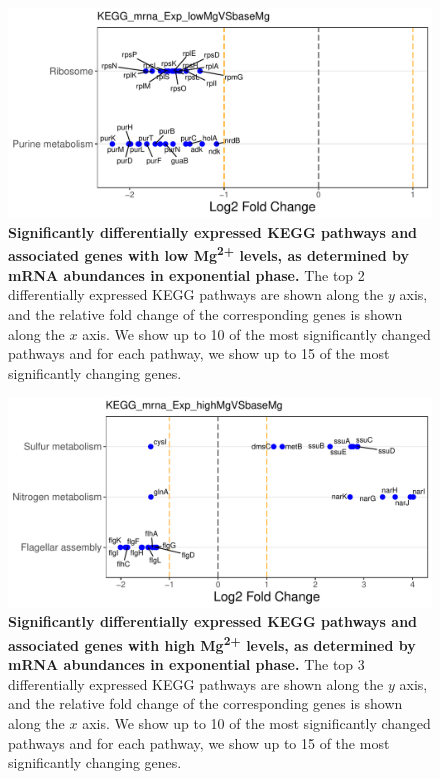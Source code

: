 \documentclass[a4paper]{article}
\begin{document}
\clearpage
\begin{figure}
	\includegraphics[width=1.0\textwidth]{../../d_figures/KEGG09_mrna_Exp_lowMgVSbaseMg_withTitle.pdf}
	\caption[Significantly differentially expressed KEGG pathways for mRNA samples in exponential phase tested for low Mg\textsuperscript{2+} levels against base Mg\textsuperscript{2+}]
	{\textbf{Significantly differentially expressed KEGG pathways and associated genes with low Mg\textsuperscript{2+} levels, as determined by mRNA abundances in exponential phase.} The top 2 differentially expressed KEGG pathways are shown along the $y$ axis, and the relative fold change of the corresponding genes is shown along the $x$ axis. We show up to 10 of the most significantly changed pathways and for each pathway, we show up to 15 of the most significantly changing genes.}
\end{figure}

\clearpage
\begin{figure}
	\includegraphics[width=1.0\textwidth]{../../d_figures/KEGG10_mrna_Exp_highMgVSbaseMg_withTitle.pdf}
	\caption[Significantly differentially expressed KEGG pathways for mRNA samples in exponential phase tested for high Mg\textsuperscript{2+} against base Mg\textsuperscript{2+}]
	{\textbf{Significantly differentially expressed KEGG pathways and associated genes with high Mg\textsuperscript{2+} levels, as determined by mRNA abundances in exponential phase.} The top 3 differentially expressed KEGG pathways are shown along the $y$ axis, and the relative fold change of the corresponding genes is shown along the $x$ axis. We show up to 10 of the most significantly changed pathways and for each pathway, we show up to 15 of the most significantly changing genes.}
\end{figure}
\end{document}
